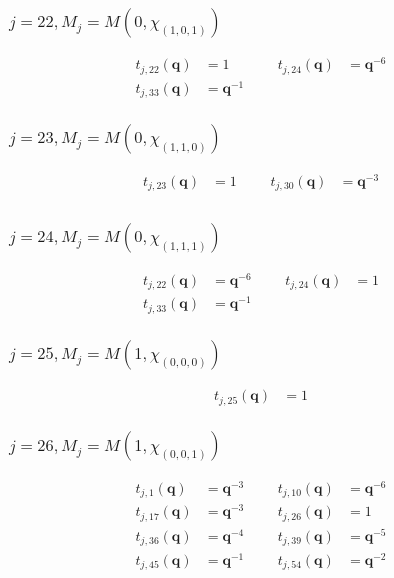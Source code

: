\subsubsection{$j=22, M_{j}=M(0,\chi_{(1,0,1)})$}
\begin{align*}
t_{j,22}(\boldsymbol{q})&=1 &&& t_{j,24}(\boldsymbol{q})&=\boldsymbol{q}^{-6} \\
t_{j,33}(\boldsymbol{q})&=\boldsymbol{q}^{-1}
\end{align*}

\subsubsection{$j=23, M_{j}=M(0,\chi_{(1,1,0)})$}
\begin{align*}
t_{j,23}(\boldsymbol{q})&=1 &&& t_{j,30}(\boldsymbol{q})&=\boldsymbol{q}^{-3} \\
\end{align*}

\subsubsection{$j=24, M_{j}=M(0,\chi_{(1,1,1)})$}
\begin{align*}
t_{j,22}(\boldsymbol{q})&=\boldsymbol{q}^{-6} &&& t_{j,24}(\boldsymbol{q})&=1 \\
t_{j,33}(\boldsymbol{q})&=\boldsymbol{q}^{-1}
\end{align*}

\subsubsection{$j=25, M_{j}=M(1,\chi_{(0,0,0)})$}
\begin{align*}
t_{j,25}(\boldsymbol{q})&=1
\end{align*}

\subsubsection{$j=26, M_{j}=M(1,\chi_{(0,0,1)})$}
\begin{align*}
t_{j,1}(\boldsymbol{q})&=\boldsymbol{q}^{-3} &&& t_{j,10}(\boldsymbol{q})&=\boldsymbol{q}^{-6} \\
t_{j,17}(\boldsymbol{q})&=\boldsymbol{q}^{-3} &&& t_{j,26}(\boldsymbol{q})&=1 \\
t_{j,36}(\boldsymbol{q})&=\boldsymbol{q}^{-4} &&& t_{j,39}(\boldsymbol{q})&=\boldsymbol{q}^{-5} \\
t_{j,45}(\boldsymbol{q})&=\boldsymbol{q}^{-1} &&& t_{j,54}(\boldsymbol{q})&=\boldsymbol{q}^{-2} \\
\end{align*}

